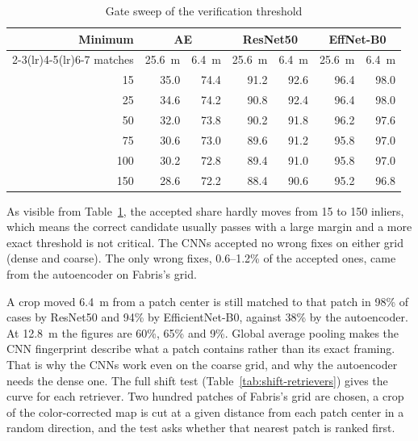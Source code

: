 \documentclass[english, Lau, oneside]{sapthesis}%
\begin{document}
\begin{table}[!htbp]
  \centering
  \caption{Gate sweep of the verification threshold}
  \label{tab:gate}
  \small
  \begin{tabular}{rrrrrrr}
    \toprule
    Minimum & \multicolumn{2}{c}{AE} & \multicolumn{2}{c}{ResNet50} & \multicolumn{2}{c}{EffNet-B0} \\
    \cmidrule(lr){2-3}\cmidrule(lr){4-5}\cmidrule(lr){6-7}
    matches & 25.6~m & 6.4~m & 25.6~m & 6.4~m & 25.6~m & 6.4~m \\
    \midrule
    15 & 35.0 & 74.4 & 91.2 & 92.6 & 96.4 & 98.0 \\
    25 & 34.6 & 74.2 & 90.8 & 92.4 & 96.4 & 98.0 \\
    50 & 32.0 & 73.8 & 90.2 & 91.8 & 96.2 & 97.6 \\
    75 & 30.6 & 73.0 & 89.6 & 91.2 & 95.8 & 97.0 \\
    100 & 30.2 & 72.8 & 89.4 & 91.0 & 95.8 & 97.0 \\
    150 & 28.6 & 72.2 & 88.4 & 90.6 & 95.2 & 96.8 \\
    \bottomrule
  \end{tabular}
\end{table}

As visible from Table~\ref{tab:gate}, the accepted share hardly moves from 15 to 150 inliers, which means the correct candidate usually passes with a large margin and a more exact threshold is not critical. The CNNs accepted no wrong fixes on either grid (dense and coarse). The only wrong fixes, 0.6--1.2\% of the accepted ones, came from the autoencoder on Fabris's grid.

A crop moved 6.4~m from a patch center is still matched to that patch in 98\% of cases by ResNet50 and 94\% by EfficientNet-B0, against 38\% by the autoencoder. At 12.8~m the figures are 60\%, 65\% and 9\%. Global average pooling makes the CNN fingerprint describe what a patch contains rather than its exact framing. That is why the CNNs work even on the coarse grid, and why the autoencoder needs the dense one. The full shift test (Table~\ref{tab:shift-retrievers}) gives the curve for each retriever. Two hundred patches of Fabris's grid are chosen, a crop of the color-corrected map is cut at a given distance from each patch center in a random direction, and the test asks whether that nearest patch is ranked first.
\end{document}

